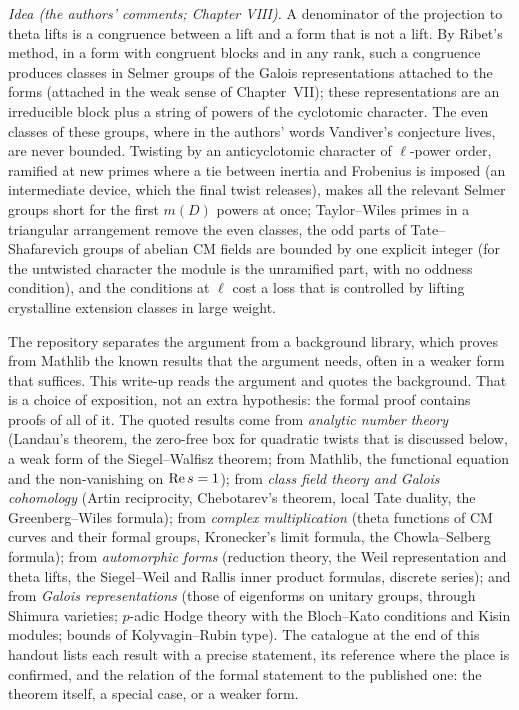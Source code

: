 \emph{Idea (the authors' comments; Chapter VIII).} A denominator of the projection to theta lifts is a congruence
between a lift and a form that is not a lift. By Ribet's method, in a form with congruent blocks and in any rank, such
a congruence produces classes in Selmer groups of the Galois representations attached to the forms (attached in the
weak sense of Chapter~VII); these
representations are an irreducible block plus a string of powers of the cyclotomic character. The even classes of
these groups, where in the authors' words Vandiver's conjecture lives, are never bounded. Twisting by an
anticyclotomic character of $\ell$-power order, ramified at new primes where a tie between inertia and Frobenius is
imposed (an intermediate device, which the final twist releases), makes all the relevant Selmer groups short for the first $m(D)$ powers at once; Taylor--Wiles primes in a
triangular arrangement remove the even classes, the odd parts of Tate--Shafarevich groups of abelian CM fields
are bounded by one explicit integer (for the untwisted character the module is the unramified part, with no oddness
condition), and the conditions at $\ell$ cost a loss that is controlled by lifting crystalline extension classes in
large weight.


The repository separates the argument from a background library, which proves from Mathlib the known results
that the argument needs, often in a weaker form that suffices. This write-up reads the argument and quotes the
background. That is a choice of exposition, not an extra hypothesis: the formal proof contains proofs of all of it.
The quoted results come from \emph{analytic number theory} (Landau's theorem, the zero-free box for quadratic
twists that is discussed below, a weak form of the Siegel--Walfisz theorem; from Mathlib, the functional equation and the non-vanishing on
$\operatorname{Re} s=1$); from \emph{class field theory and Galois cohomology} (Artin reciprocity, Chebotarev's theorem, local
Tate duality, the Greenberg--Wiles formula); from \emph{complex multiplication} (theta functions of CM curves and
their formal groups, Kronecker's limit formula, the Chowla--Selberg formula); from \emph{automorphic forms}
(reduction theory, the Weil representation and theta lifts, the Siegel--Weil and Rallis inner product formulas,
discrete series); and from \emph{Galois representations} (those of eigenforms on unitary groups, through Shimura
varieties; $p$-adic Hodge theory with the Bloch--Kato conditions and Kisin modules; bounds of Kolyvagin--Rubin
type). The catalogue at the end of this handout lists each result with a precise statement, its reference where the
place is confirmed, and the relation of the formal statement to the published one: the theorem itself, a special
case, or a weaker form.

